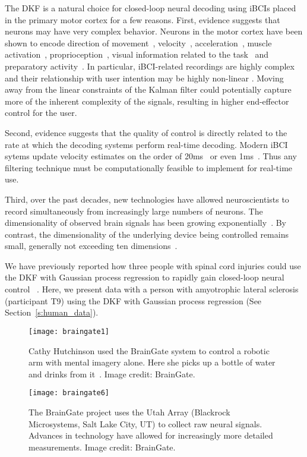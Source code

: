 The DKF is a natural choice for closed-loop neural decoding using iBCIs placed in the primary motor cortex for a few reasons. First, evidence suggests that neurons may have very complex behavior. Neurons in the motor cortex have been shown to encode direction of movement~\cite{Geo88}, velocity~\cite{Sch94}, acceleration~\cite{Pan11}, muscle activation~\cite{Lem08, Poh07}, proprioception~\cite{Ben14}, visual information related to the task~\cite{Rao14} and preparatory activity~\cite{Chu12}. In particular, iBCI-related recordings are highly complex and their relationship with user intention may be highly non-linear \cite{Var15}. Moving away from the linear constraints of the Kalman filter could potentially capture more of the inherent complexity of the signals, resulting in higher end-effector control for the user. 

Second, evidence suggests that the quality of control is directly related to the rate at which the decoding systems perform real-time decoding. Modern iBCI sytems update velocity estimates on the order of 20ms~\cite{Jar15} or even 1ms~\cite{Pan15}. Thus any filtering technique must be computationally feasible to implement for real-time use.

Third, over the past decades, new technologies have allowed neuroscientists to record simultaneously from increasingly large numbers of neurons. The dimensionality of observed brain signals has been growing exponentially~\cite{Ste11}. By contrast,  the dimensionality of the underlying device being controlled remains small, generally not exceeding ten dimensions~\cite{Wod15,Var10}. 

We have previously reported how three people with spinal cord injuries could use the DKF with Gaussian process regression to rapidly gain closed-loop neural control ~\cite{Bra18}. Here, we present data with a person with amyotrophic lateral sclerosis (participant T9) using the DKF with Gaussian process regression (See Section~\ref{s:human_data}).

\begin{figure}[h]
\begin{minipage}[t]{.45\textwidth}
\texttt{[image: braingate1]}
\caption[Controlling a Robotic Arm through Mental Imagery Alone]{Cathy Hutchinson used the BrainGate system to control a robotic arm with mental imagery alone.  Here she picks up a bottle of water and drinks from it~\cite{Ven12}. Image credit: BrainGate.}
\end{minipage}%
\hfill
\begin{minipage}[t]{.45\textwidth}
\texttt{[image: braingate6]}
\caption[The Utah Array]{The BrainGate project uses the Utah Array (Blackrock Microsystems, Salt Lake City, UT) to collect raw neural signals.  Advances in technology have allowed for increasingly more detailed measurements. Image credit: BrainGate.}
\end{minipage}
\end{figure}

